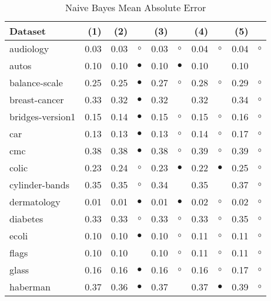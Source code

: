 \begin{table}[htb]
\caption{\label{nbmae}Naive Bayes Mean Absolute Error}
\footnotesize
{\centering \begin{tabular}{lrr@{\hspace{0.1cm}}cr@{\hspace{0.1cm}}cr@{\hspace{0.1cm}}cr@{\hspace{0.1cm}}c}
\\
\hline
Dataset & (1)& (2) & & (3) & & (4) & & (5) & \\
\hline
audiology & 0.03 & 0.03 &    $\circ$ & 0.03 &    $\circ$ & 0.04 &   $\circ$ & 0.04 &   $\circ$\\
autos & 0.10 & 0.10 &  $\bullet$ & 0.10 &  $\bullet$ & 0.10 &           & 0.10 &          \\
balance-scale & 0.25 & 0.25 &  $\bullet$ & 0.27 &    $\circ$ & 0.28 &   $\circ$ & 0.29 &   $\circ$\\
breast-cancer & 0.33 & 0.32 &  $\bullet$ & 0.32 &            & 0.32 &           & 0.34 &   $\circ$\\
bridges-version1 & 0.15 & 0.14 &  $\bullet$ & 0.15 &    $\circ$ & 0.15 &   $\circ$ & 0.16 &   $\circ$\\
car & 0.13 & 0.13 &  $\bullet$ & 0.13 &    $\circ$ & 0.14 &   $\circ$ & 0.17 &   $\circ$\\
cmc & 0.38 & 0.38 &  $\bullet$ & 0.38 &    $\circ$ & 0.39 &   $\circ$ & 0.39 &   $\circ$\\
colic & 0.23 & 0.24 &    $\circ$ & 0.23 &  $\bullet$ & 0.22 & $\bullet$ & 0.25 &   $\circ$\\
cylinder-bands & 0.35 & 0.35 &    $\circ$ & 0.34 &            & 0.35 &           & 0.37 &   $\circ$\\
dermatology & 0.01 & 0.01 &  $\bullet$ & 0.01 &  $\bullet$ & 0.02 &   $\circ$ & 0.02 &   $\circ$\\
diabetes & 0.33 & 0.33 &    $\circ$ & 0.33 &    $\circ$ & 0.33 &   $\circ$ & 0.35 &   $\circ$\\
ecoli & 0.10 & 0.10 &  $\bullet$ & 0.10 &    $\circ$ & 0.11 &   $\circ$ & 0.11 &   $\circ$\\
flags & 0.10 & 0.10 &            & 0.10 &    $\circ$ & 0.11 &   $\circ$ & 0.11 &   $\circ$\\
glass & 0.16 & 0.16 &  $\bullet$ & 0.16 &    $\circ$ & 0.16 &   $\circ$ & 0.17 &   $\circ$\\
haberman & 0.37 & 0.36 &  $\bullet$ & 0.37 &            & 0.37 & $\bullet$ & 0.39 &   $\circ$\\

\end{tabular}}
\end{table}
